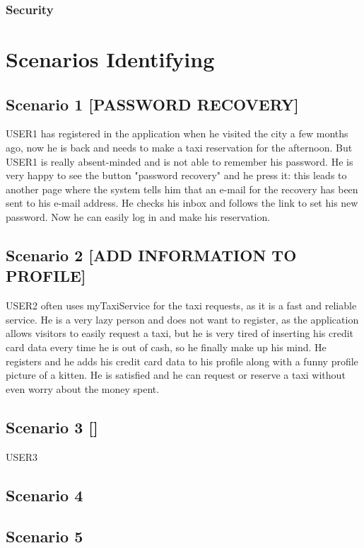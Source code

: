 \documentclass[18pt,oneside,a4paper, titlepage]{article}
\begin{document}
		\subsubsection{Security}

\newpage
\section{Scenarios Identifying}
	\subsection{Scenario 1 [PASSWORD RECOVERY]}
		USER1 has registered in the application when he visited the city a few months ago, now he is back and needs to make a taxi reservation for the afternoon. But USER1 is really absent-minded and is not able to remember his password. He is very happy to see the button "password recovery" and he press it: this leads to another page where the system tells him that an e-mail for the recovery has been sent to his e-mail address. He checks his inbox and follows the link to set his new password. Now he can easily log in and make his reservation.
		
	\subsection{Scenario 2 [ADD INFORMATION TO PROFILE]}
		USER2 often uses myTaxiService for the taxi requests, as it is a fast and reliable service. He is a very lazy person and does not want to register, as the application allows visitors to easily request a taxi, but he is very tired of inserting his credit card data every time he is out of cash, so he finally make up his mind. He registers and he adds his credit card data to his profile along with a funny profile picture of a kitten. He is satisfied and he can request or reserve a taxi without even worry about the money spent.
	
	\subsection{Scenario 3 []}
		USER3 
	\subsection{Scenario 4}
	\subsection{Scenario 5}
\end{document}
